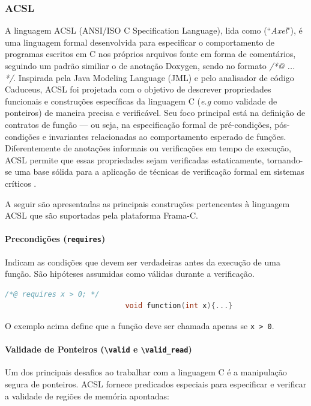 \documentclass{article}
\begin{document}
\subsubsection{ACSL}
A linguagem ACSL (ANSI/ISO C Specification Language), lida como (``\emph{Axel}"), é uma linguagem formal desenvolvida para especificar o comportamento de programas escritos em C nos próprios arquivos fonte em forma de comentários, seguindo um padrão similiar o de anotação Doxygen, sendo no formato \emph{/*@ ... */}. Inspirada pela Java Modeling Language (JML) e pelo analisador de código Caduceus, ACSL foi projetada com o objetivo de descrever propriedades funcionais e construções específicas da linguagem C (\emph{e.g} como validade de ponteiros) de maneira precisa e verificável. Seu foco principal está na definição de contratos de função — ou seja, na especificação formal de pré-condições, pós-condições e invariantes relacionadas ao comportamento esperado de funções. Diferentemente de anotações informais ou verificações em tempo de execução, ACSL permite que essas propriedades sejam verificadas estaticamente, tornando-se uma base sólida para a aplicação de técnicas de verificação formal em sistemas críticos \cite{framaCacsl}.

A seguir são apresentadas as principais construções pertencentes à linguagem ACSL que são suportadas pela plataforma Frama-C.

\paragraph{Precondições (\texttt{requires})} 
Indicam as condições que devem ser verdadeiras antes da execução de uma função. São hipóteses assumidas como válidas durante a verificação.
\begin{lstlisting}[language=C]
                            /*@ requires x > 0; */
                            void function(int x){...}
\end{lstlisting}

O exemplo acima define que a função deve ser chamada apenas se \texttt{x > 0}.

\paragraph{Validade de Ponteiros (\texttt{\textbackslash valid} e \texttt{\textbackslash valid\_read})} 

Um dos principais desafios ao trabalhar com a linguagem C é a manipulação segura de ponteiros. ACSL fornece predicados especiais para especificar e verificar a validade de regiões de memória apontadas:
\end{document}
